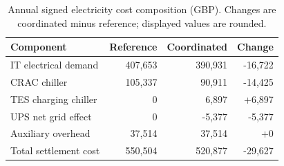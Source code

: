 \begin{table}[htbp]
\centering\small
\caption{Annual signed \textcolor{LatestGreen}{electricity cost} composition (GBP). Changes are coordinated minus reference; displayed values are rounded.}\label{tab:cost-components}
\begin{tabular}{@{}lrrr@{}}\toprule
Component & Reference & Coordinated & Change \\\midrule
IT electrical demand & 407,653 & 390,931 & -16,722 \\
CRAC chiller & 105,337 & 90,911 & -14,425 \\
TES charging chiller & 0 & 6,897 & +6,897 \\
UPS net grid effect & 0 & -5,377 & -5,377 \\
Auxiliary overhead & 37,514 & 37,514 & +0 \\
Total settlement cost & 550,504 & 520,877 & -29,627 \\
\bottomrule\end{tabular}
\end{table}
